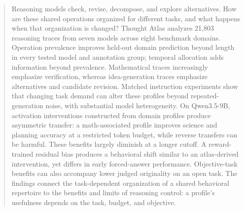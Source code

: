 \begin{abstract}
Reasoning models check, revise, decompose, and explore alternatives. How are these shared operations organized for different tasks, and what happens when that organization is changed? Thought Atlas analyzes 21,803 reasoning traces from seven models across eight benchmark domains. Operation prevalence improves held-out domain prediction beyond length in every tested model and annotation group; temporal allocation adds information beyond prevalence. Mathematical traces increasingly emphasize verification, whereas idea-generation traces emphasize alternatives and candidate revision. Matched instruction experiments show that changing task demand can alter these profiles beyond repeated-generation noise, with substantial model heterogeneity. On Qwen3.5-9B, activation interventions constructed from domain profiles produce asymmetric transfer: a math-associated profile improves science and planning accuracy at a restricted token budget, while reverse transfers can be harmful. These benefits largely diminish at a longer cutoff. A reward-trained residual bias produces a behavioral shift similar to an atlas-derived intervention, yet differs in early forced-answer performance. Objective-task benefits can also accompany lower judged originality on an open task. The findings connect the task-dependent organization of a shared behavioral repertoire to the benefits and limits of reasoning control: a profile's usefulness depends on the task, budget, and objective.
\end{abstract}
